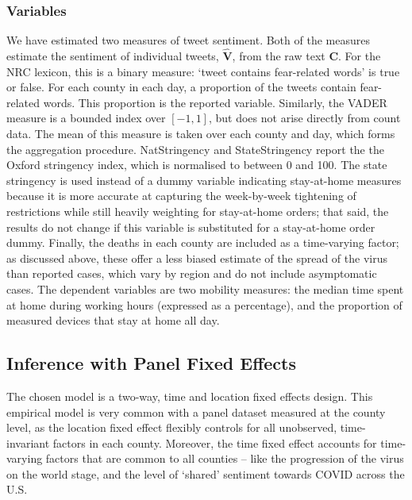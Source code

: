 \documentclass[12pt,a4]{article}
\begin{document}
\subsubsection{Variables}
We have estimated two measures of tweet sentiment. Both of the measures estimate the sentiment of individual tweets, \(\hat{\mathbf{V}}\), from the raw text \(\mathbf{C}\). For the NRC lexicon, this is a binary measure: `tweet contains fear-related words' is true or false. For each county in each day, a proportion of the tweets contain fear-related words. This proportion is the reported variable. Similarly, the VADER measure is a bounded index over \([-1,1]\), but does not arise directly from count data. The mean of this measure is taken over each county and day, which forms the aggregation procedure. NatStringency and StateStringency report the the Oxford stringency index, which is normalised to between 0 and 100. The state stringency is used instead of a dummy variable indicating stay-at-home measures because it is more accurate at capturing the week-by-week tightening of restrictions while still heavily weighting for stay-at-home orders; that said, the results do not change if this variable is substituted for a stay-at-home order dummy.  Finally, the deaths in each county are included as a time-varying factor; as discussed above, these offer a less biased estimate of the spread of the virus than reported cases, which vary by region and do not include asymptomatic cases. The dependent variables are two mobility measures: the median time spent at home during working hours (expressed as a percentage), and the proportion of measured devices that stay at home all day.

\subsection{Inference with Panel Fixed Effects}
The chosen model is a two-way, time and location fixed effects design. This empirical model is very common with a panel dataset measured at the county level, as the location fixed effect flexibly controls for all unobserved, time-invariant factors in each county. Moreover, the time fixed effect accounts for time-varying factors that are common to all counties -- like the progression of the virus on the world stage, and the level of `shared' sentiment towards COVID across the U.S. 
\end{document}
